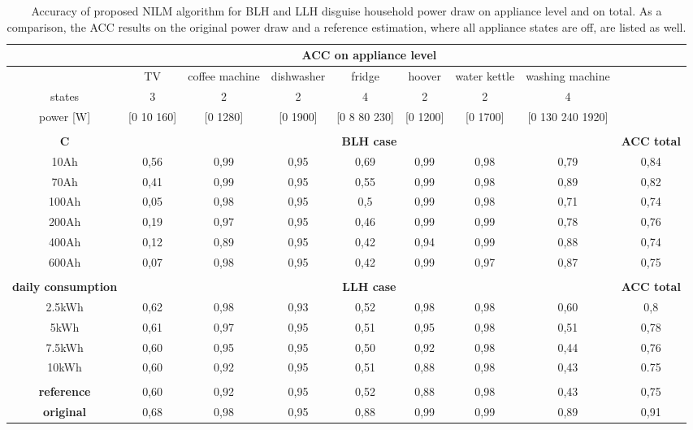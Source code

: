 \documentclass{article}
\begin{document}
\begin{landscape}
\begin{table*}
\centering
\begin{tabular}{|c|ccccccc|c|} 
\hline
&\multicolumn{7}{c|}{\textbf{\ac{ACC} on appliance level}} & \\
\hline

  & TV & coffee machine  & dishwasher & fridge & hoover & water kettle & washing machine & \\
  \hline
states  & 3 & 2  & 2 & 4 & 2 & 2 & 4 & \\ 
power [W] & [0 10 160] & [0 1280]  & [0 1900] & [0 8 80 230]  & [0 1200]  & [0 1700]   & [0 130 240 1920]  & \\
\hline
\hline
\multicolumn{7}{c}{}\\
\hline
\textbf{C} & \multicolumn{7}{c|}{\textbf{\ac{BLH} case}} &  \textbf{\ac{ACC} total} \\
\hline
10Ah & 0,56 & 	0,99 & 	0,95 & 	0,69 & 	0,99 & 	0,98 &	0,79 & 0,84 \\
70Ah &  0,41& 	0,99 & 	0,95 & 	0,55 & 	0,99 & 	0,98 & 	0,89 & 	0,82 \\
100Ah & 0,05 & 	0,98 & 	0,95 & 	0,5 & 	0,99 &	0,98 & 	0,71 & 0,74 	\\
200Ah &  0,19 & 	0,97 & 	0,95 &	0,46 & 	0,99 & 	0,99 & 	0,78 & 0,76	\\
400Ah & 0,12 & 	0,89 & 	0,95 & 	0,42 & 	0,94 & 	0,99 &	0,88 	& 0,74\\
600Ah & 0,07 & 	0,98 & 	0,95 & 	0,42 & 	0,99 & 	0,97 & 	0,87 & 0,75\\
\hline

\multicolumn{7}{c}{}\\
\hline
\textbf{daily consumption} & \multicolumn{7}{c|}{\textbf{\ac{LLH} case}} &  \textbf{\ac{ACC} total} \\
\hline
2.5kWh & 0,62	& 0,98& 	0,93 &	0,52  & 	0,98 & 	0,98 &	0,60 & 0,8 \\
5kWh &  0,61& 	0,97& 	0,95 & 	0,51 & 	0,95 & 	0,98 & 	0,51 & 0,78  	\\
7.5kWh & 0,60 & 	0,95& 	0,95 & 	0,50 & 	0,92 & 	0,98 & 	0,44 & 0,76 	\\
10kWh &  0,60 & 	0,92 & 	0,95& 	0,51 &	0,88 & 	0,98 & 	0,43 & 0.75 	\\
\hline

\multicolumn{7}{c}{}\\
\hline
\textbf{reference} & 0,60 &	0,92 & 	0,95 &	0,52 &	0,88 &	0,98 &	0,43 & 0,75 \\
 \hline
\textbf{original} &  0,68 &   0,98 &    0,95 &   0,88 &    0,99 &    0,99 &    0,89 & 0,91 \\ 
 \hline
\end{tabular}
\caption{Accuracy of proposed \ac{NILM} algorithm for \ac{BLH} and  \ac{LLH} disguise household power draw on appliance level and on total. As a comparison, the \ac{ACC} results on the original power draw and a reference estimation, where all appliance states are off, are listed as well.}
\label{tab:BLHResult}
\end{table*}
\end{landscape}
\end{document}
